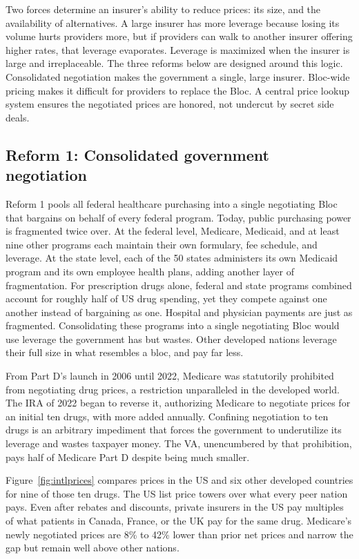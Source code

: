 \documentclass[12pt]{article}
\begin{document}
Two forces determine an insurer's ability to reduce prices: its size, and the availability of alternatives. A large insurer has more leverage because losing its volume hurts providers more, but if providers can walk to another insurer offering higher rates, that leverage evaporates. Leverage is maximized when the insurer is large and irreplaceable. The three reforms below are designed around this logic. Consolidated negotiation makes the government a single, large insurer. Bloc-wide pricing makes it difficult for providers to replace the Bloc. A central price lookup system ensures the negotiated prices are honored, not undercut by secret side deals.

\subsection*{Reform 1: Consolidated government negotiation}

Reform 1 pools all federal healthcare purchasing into a single negotiating Bloc that bargains on behalf of every federal program. Today, public purchasing power is fragmented twice over. At the federal level, Medicare, Medicaid, and at least nine other programs each maintain their own formulary, fee schedule, and leverage. At the state level, each of the 50 states administers its own Medicaid program and its own employee health plans, adding another layer of fragmentation. For prescription drugs alone, federal and state programs combined account for roughly half of US drug spending, yet they compete against one another instead of bargaining as one.\citep{cms2024nhe} Hospital and physician payments are just as fragmented. Consolidating these programs into a single negotiating Bloc would use leverage the government has but wastes. Other developed nations leverage their full size in what resembles a bloc, and pay far less.\citep{anderson2003prices, gusmano2020price}

From Part D's launch in 2006 until 2022, Medicare was statutorily prohibited from negotiating drug prices, a restriction unparalleled in the developed world. The \ac{IRA} of 2022 began to reverse it, authorizing Medicare to negotiate prices for an initial ten drugs, with more added annually. Confining negotiation to ten drugs is an arbitrary impediment that forces the government to underutilize its leverage and wastes taxpayer money. The VA, unencumbered by that prohibition, pays half of Medicare Part D despite being much smaller.\citep{cbo2021drugprices, gao2021vadrugs}

Figure~\ref{fig:intlprices} compares prices in the US and six other developed countries for nine of those ten drugs. The US list price towers over what every peer nation pays. Even after rebates and discounts, private insurers in the US pay multiples of what patients in Canada, France, or the UK pay for the same drug. Medicare's newly negotiated prices are 8\% to 42\% lower than prior net prices\citep{wouters2025jama} and narrow the gap but remain well above other nations.
\end{document}
